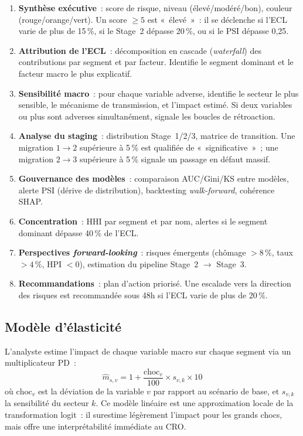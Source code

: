 \documentclass[12pt, a4paper, twoside, openright]{report}
\theoremstyle{definition}
\begin{document}
\begin{enumerate}
  \item \textbf{Synthèse exécutive}~: score de risque, niveau (élevé/modéré/bon), couleur (rouge/orange/vert). Un score $\geq 5$ est «~élevé~»~: il se déclenche si l'ECL varie de plus de 15\,\%, si le Stage~2 dépasse 20\,\%, ou si le PSI dépasse 0{,}25.

  \item \textbf{Attribution de l'ECL}~: décomposition en cascade (\emph{waterfall}) des contributions par segment et par facteur. Identifie le segment dominant et le facteur macro le plus explicatif.

  \item \textbf{Sensibilité macro}~: pour chaque variable adverse, identifie le secteur le plus sensible, le mécanisme de transmission, et l'impact estimé. Si deux variables ou plus sont adverses simultanément, signale les boucles de rétroaction.

  \item \textbf{Analyse du staging}~: distribution Stage~1/2/3, matrice de transition. Une migration $1 \to 2$ supérieure à 5\,\% est qualifiée de «~significative~»~; une migration $2 \to 3$ supérieure à 5\,\% signale un passage en défaut massif.

  \item \textbf{Gouvernance des modèles}~: comparaison AUC/Gini/KS entre modèles, alerte PSI (dérive de distribution), backtesting \emph{walk-forward}, cohérence SHAP.

  \item \textbf{Concentration}~: HHI par segment et par nom, alertes si le segment dominant dépasse 40\,\% de l'ECL.

  \item \textbf{Perspectives \emph{forward-looking}}~: risques émergents (chômage $> 8\,\%$, taux $> 4\,\%$, HPI $< 0$), estimation du pipeline Stage~2 $\to$ Stage~3.

  \item \textbf{Recommandations}~: plan d'action priorisé. Une escalade vers la direction des risques est recommandée sous 48h si l'ECL varie de plus de 20\,\%.
\end{enumerate}

\subsection{Modèle d'élasticité}

L'analyste estime l'impact de chaque variable macro sur chaque segment via un multiplicateur PD~:
\begin{equation}
\hat{m}_{s,v} = 1 + \frac{\text{choc}_v}{100} \times s_{v,k} \times 10
\label{eq:elasticity}
\end{equation}
où $\text{choc}_v$ est la déviation de la variable $v$ par rapport au scénario de base, et $s_{v,k}$ la sensibilité du secteur $k$. Ce modèle linéaire est une approximation locale de la transformation logit~: il surestime légèrement l'impact pour les grands chocs, mais offre une interprétabilité immédiate au CRO.
\end{document}
